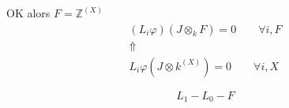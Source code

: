 OK alors $F=\mathbb Z^{(X)}$
\[
\begin{gathered}
(L_i\varphi)(J\otimes_kF)=0\qquad\forall i,F\\
\Uparrow\\
L_i\varphi(J\otimes k^{(X)})=0\qquad\forall i,X
\end{gathered}
\]



\[
L_1\mathbin{-}L_0\mathbin{-}F
\]


